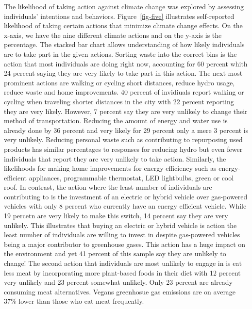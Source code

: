 \documentclass[
  letterpaper,
  DIV=11,
  numbers=noendperiod]{scrartcl}
\begin{document}
The likelihood of taking action against climate change was explored by
assessing individuals' intentions and behaviors. Figure~\ref{fig-five}
illustrates self-reported likelihood of taking certain actions that
minimize climate change effects. On the x-axis, we have the nine
different climate actions and on the y-axis is the percentage. The
stacked bar chart allows understanding of how likely individuals are to
take part in the given actions. Sorting waste into the correct bins is
the action that most individuals are doing right now, accounting for 60
percent whith 24 percent saying they are very likely to take part in
this action. The next most prominent actions are walking or cycling
short distances, reduce hydro usage, reduce waste and home improvements.
40 percent of invidiuals report walking or cycling when traveling
shorter distances in the city with 22 percent reporting they are very
likely. However, 7 percent say they are very unlikely to change their
method of transportation. Reducing the amount of energy and water use is
already done by 36 percent and very likely for 29 percent only a mere 3
percent is very unlikely. Reducing personal waste such as contributing
to repurposing used products has similar percentages to responses for
reducing hydro but even fewer individuals that report they are very
unlikely to take action. Similarly, the likelihoods for making home
improvements for energy efficiency such as energy-efficient appliances,
programmable thermostat, LED lightbulbs, green or cool roof. In
contrast, the action where the least number of individuals are
contributing to is the investment of an electric or hybrid vehicle over
gas-powered vehicles with only 8 percent who currently have an energy
efficient vehicle. While 19 percetn are very likely to make this switch,
14 percent say they are very unlikely. This illustrates that buying an
electric or hybrid vehicle is action the least number of individuals are
willing to invest in despite gas-powered vehicles being a major
contributor to greenhouse gases. This action has a huge impact on the
environment and yet 41 percent of this sample say they are unlikely to
change! The second action that individuals are most unlikely to engage
in is eat less meat by incorporating more plant-based foods in their
diet with 12 percent very unlikely and 23 percent somewhat unlikely.
Only 23 percent are already consuming meat alternatives. Vegans
greenhosue gas emissions are on average 37\% lower than those who eat
meat frequently.
\end{document}
